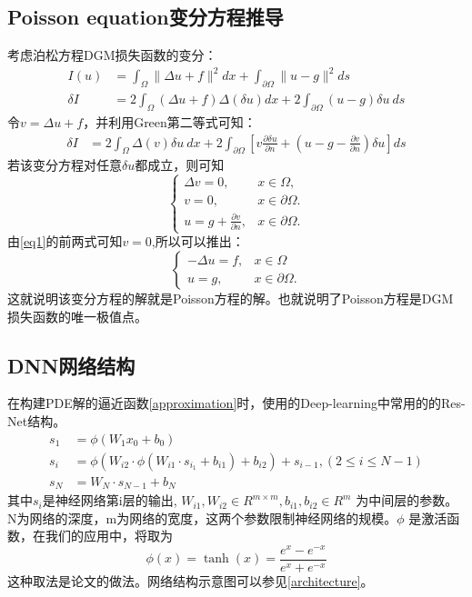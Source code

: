\documentclass{article}
\begin{document}
\subsection{Poisson equation变分方程推导}
考虑泊松方程DGM损失函数的变分：
\begin{align*}
I(u) &= \int_{\Omega} \|\Delta u + f\|^2 dx + \int_{\partial \Omega} \|u-g\|^2ds \\
\delta I &= 2\int_{\Omega}(\Delta u + f)\Delta (\delta u) dx + 2\int_{\partial \Omega}(u-g)\delta u \ ds
\end{align*}
令$v = \Delta u + f$，并利用Green第二等式可知：
\begin{align*}
\delta I &= 2\int_{\Omega}\Delta(v)\delta u\ dx + 2\int_{\partial \Omega}\left[v\frac{\partial \delta u}{\partial n} + (u-g -\frac{\partial v}{\partial n})\delta u \right] ds
\end{align*}
若该变分方程对任意$\delta u$都成立，则可知
\begin{equation}\label{eq1}
	\begin{cases}
 		\Delta v=0, & x\in \Omega, \\
 		v=0, & x\in \partial \Omega. \\
 		u=g+\frac{\partial v}{\partial n}, & x\in \partial\Omega.
 	\end{cases}
\end{equation}
由\ref{eq1}的前两式可知$v = 0$,所以可以推出：
\begin{equation}\label{Poisson}
	\begin{cases}
 		-\Delta u = f,& x\in\Omega \\
 		u=g, & x\in \partial\Omega.
 	\end{cases}
\end{equation}
这就说明该变分方程的解就是Poisson方程的解。也就说明了Poisson方程是DGM损失函数的唯一极值点。

\subsection{DNN网络结构}
\par{} 在构建PDE解的逼近函数\ref{approximation}时，使用的Deep-learning中常用的的Res-Net\cite{ResNet}结构。
\begin{align*}\label{res_equ}
	s_1 &= \phi(W_1 x_0 + b_0) \\
	s_i &= \phi(W_{i2}\cdot\phi(W_{i1}\cdot s_{i_1}+b_{i1})+b_{i2})+s_{i-1}, (2\leq i \leq N-1)\\
	s_N &= W_N\cdot s_{N-1} + b_N
\end{align*}
其中$s_{i}$是神经网络第i层的输出, $W_{i1},W_{i2}\in R^{m\times m},b_{i1},b_{i2}\in R^{m}$ 为中间层的参数。N为网络的深度，m为网络的宽度，这两个参数限制神经网络的规模。$\phi$ 是激活函数，在我们的应用中，将取为
$$
\phi(x) = \tanh(x) = \frac{e^{x} - e^{-x}}{e^x + e^{-x}}
$$
这种取法是论文\cite{PINN}的做法。网络结构示意图可以参见\ref{architecture}。

\end{document}
